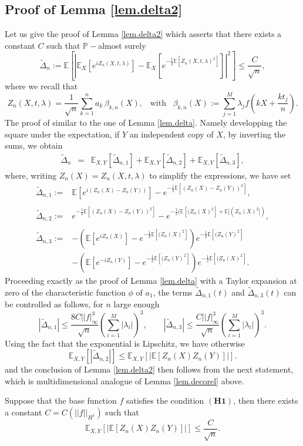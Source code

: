 \documentclass{svproc}
\newcommand \Esp {\mathbb{E}}
\begin{document}
\subsection{Proof of Lemma \ref{lem.delta2}} \label{sec.delta2}
Let us give the proof of Lemma \ref{lem.delta2} which asserts that there exists a constant $C$ such that $\mathbb P-$almost surely
\[
\widetilde{\Delta}_n:=\mathbb E\left[ \left| \Esp_X \left[e^{iZ_n(X,t,\lambda)} \right]  - \Esp_X\left[e^{-\frac{1}{2}\Esp[Z_n(X,t,\lambda)^2]}\right]\right|^2\right] \leq \frac{C}{\sqrt{n}},
\]
where we recall that 
\[
Z_n(X,t,\lambda)= \frac{1}{\sqrt{n}} \sum_{k=1}^n a_k \, \beta_{k,n}(X), \;\; \;\text{with}\;\;\; \beta_{k,n}(X):=\sum_{j=1}^{M}\lambda_j f\left(kX+\frac{kt_j}{n}\right).
\]
The proof of similar to the one of Lemma \ref{lem.delta}. Namely developping the square under the expectation, if $Y$ an independent copy of $X$, by inverting the sums, we obtain
\begin{eqnarray*}
\widetilde{\Delta}_n&=&\Esp_{X,Y}\left[\widetilde{\Delta}_{n,1}\right]+\Esp_{X,Y}\left[\widetilde{\Delta}_{n,2}\right]+\Esp_{X,Y}\left[\widetilde{\Delta}_{n,3}\right],
\end{eqnarray*}
where, writing $Z_n(X)=Z_n(X,t,\lambda)$ to simplify the expressions, we have set
\[
\begin{array}{ll}
\widetilde{\Delta}_{n,1}:=& \displaystyle{\Esp[e^{i(Z_n(X)-Z_n(Y))}]-e^{-\frac{1}{2}\Esp[(Z_n(X)-Z_n(Y))^2]}} ,\\
\\
\widetilde{\Delta}_{n,2}:=& \displaystyle{e^{-\frac{1}{2}\Esp[(Z_n(X)-Z_n(Y))^2]} -   e^{-\frac{1}{2}(\Esp[(Z_n(X)^2]+\Esp[(Z_n(X)^2])}},\\
\\
\widetilde{\Delta}_{n,3}:=&\displaystyle{-\left(\Esp\left[e^{i Z_n(X)}\right]-e^{-\frac{1}{2}\Esp[(Z_n(X)^2]}\right)e^{-\frac{1}{2}\Esp[(Z_n(Y)^2]}} \\
& \displaystyle{- \left(\Esp\left[e^{-i Z_n(Y)}\right]-e^{-\frac{1}{2}\Esp[(Z_n(Y)^2]}\right)e^{-\frac{1}{2}\Esp[(Z_n(X)^2]}}.
\end{array}\]
Proceeding exactly as the proof of Lemma \ref{lem.delta} with a Taylor expansion at zero of the characteristic function $\phi$ of $a_1$, the terms $\widetilde{\Delta}_{n,1}(t)$ and $\widetilde{\Delta}_{n,3}(t)$ can be controlled as follows, for $n$ large enough
\[
|\widetilde{\Delta}_{n,1} |\leq \frac{8 C ||f|_{\infty}^3}{\sqrt{n}}\left( \sum_{i=1}^M |\lambda_i|\right)^3, \qquad |\widetilde{\Delta}_{n,3} |\leq \frac{ C ||f|_{\infty}^3}{\sqrt{n}}\left( \sum_{i=1}^M |\lambda_i|\right)^3.
\]
Using the fact that the exponential is Lipschitz, we have otherwise
\[
\mathbb E_{X,Y} \left[|\widetilde{\Delta}_{n,2}| \right] \leq \mathbb E_{X,Y} \left[ |\mathbb E [Z_n(X)Z_n(Y)]| \right].
\]
and the conclusion of Lemma \ref{lem.delta2} then follows from the next statement, which is multidimensional analogue of Lemma \ref{lem.decorel} above.
\begin{lemma}{Suppose that the base function $f$ satisfies the condition $\mathbf{(H1)}$}, then there exists a constant $C=C(||f||_{H^1})$ such that
\[
\mathbb E_{X,Y} \left[ \left|\mathbb E[Z_n(X)Z_n(Y)] \right|\right]\leq \frac{C}{\sqrt{n}}.
\]\label{lem.decorel2}
\end{lemma}
\end{document}
